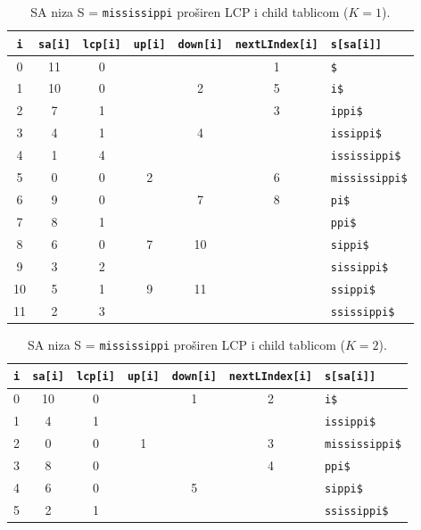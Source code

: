 \documentclass[times, utf8, seminar, numeric]{fer}
\begin{document}
\begin{table}[h]
	\centering
  \caption{SA  niza S = \texttt{mississippi} proširen LCP i child tablicom ($K = 1$).}
	\label{tbl:example-full}
	
	\begin{tabular}{ccccccl}
		\hline
    \texttt{i} & \texttt{sa[i]} & \texttt{lcp[i]} & \texttt{up[i]} & \texttt{down[i]} & \texttt{nextLIndex[i]} & \texttt{s[sa[i]]} \\ \hline
     0 & 11 &  0 &    &    &  1 & \texttt{\$} \\
     1 & 10 &  0 &    &  2 &  5 & \texttt{i\$} \\
     2 &  7 &  1 &    &    &  3 & \texttt{ippi\$} \\
     3 &  4 &  1 &    &  4 &    & \texttt{issippi\$} \\
     4 &  1 &  4 &    &    &    & \texttt{ississippi\$} \\
     5 &  0 &  0 &  2 &    &  6 & \texttt{mississippi\$} \\
     6 &  9 &  0 &    &  7 &  8 & \texttt{pi\$} \\
     7 &  8 &  1 &    &    &    & \texttt{ppi\$} \\
     8 &  6 &  0 &  7 & 10 &    & \texttt{sippi\$} \\
     9 &  3 &  2 &    &    &    & \texttt{sissippi\$} \\
    10 &  5 &  1 &  9 & 11 &    & \texttt{ssippi\$} \\
    11 &  2 &  3 &    &    &    & \texttt{ssissippi\$} \\ \hline
	\end{tabular}
\end{table}

\begin{table}[h]
	\centering
  \caption{SA  niza S = \texttt{mississippi} proširen LCP i child tablicom ($K = 2$).}
	\label{tbl:example}
	
	\begin{tabular}{ccccccl}
		\hline
    \texttt{i} & \texttt{sa[i]} & \texttt{lcp[i]} & \texttt{up[i]} & \texttt{down[i]} & \texttt{nextLIndex[i]} & \texttt{s[sa[i]]} \\ \hline
    0 & 10 &  0 &    &  1 &  2 & \texttt{i\$}           \\
    1 &  4 &  1 &    &    &    & \texttt{issippi\$}     \\
    2 &  0 &  0 &  1 &    &  3 & \texttt{mississippi\$} \\
    3 &  8 &  0 &    &    &  4 & \texttt{ppi\$}         \\
    4 &  6 &  0 &    &  5 &    & \texttt{sippi\$}       \\
    5 &  2 &  1 &    &    &    & \texttt{ssissippi\$}   \\ \hline
	\end{tabular}
\end{table}
\end{document}
